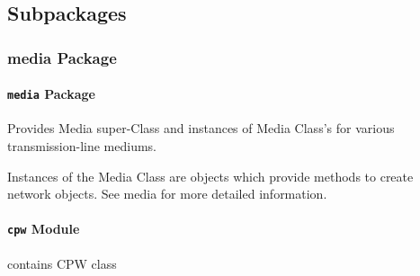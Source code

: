 \documentclass[letterpaper,10pt,english]{sphinxmanual}
\begin{document}
\subsection{Subpackages}
\label{api/mwavepy:subpackages}

\subsubsection{media Package}
\label{api/mwavepy.media:api-media}\label{api/mwavepy.media::doc}\label{api/mwavepy.media:media-package}

\paragraph{\texttt{media} Package}
\label{api/mwavepy.media:id1}\label{api/mwavepy.media:module-mwavepy.media}
Provides Media super-Class and instances of Media Class's for various 
transmission-line mediums.

Instances of the Media Class are objects which provide methods to
create network objects. See media for more detailed information.


\paragraph{\texttt{cpw} Module}
\label{api/mwavepy.media:module-mwavepy.media.cpw}\label{api/mwavepy.media:cpw-module}
contains CPW class
\end{document}
